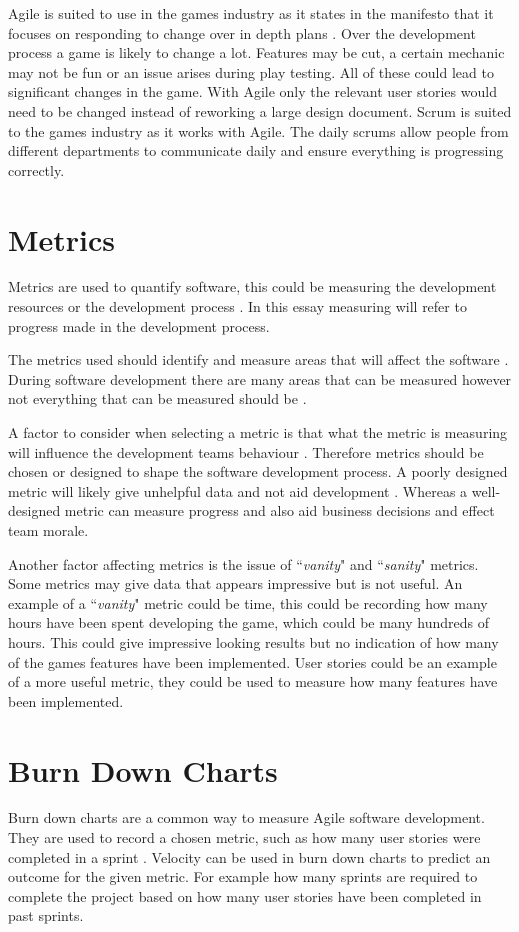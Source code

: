 \documentclass{scrartcl}
\begin{document}
Agile is suited to use in the games industry as it states in the manifesto that it focuses on responding to change over in depth plans \cite{AgileManifesto}.  Over the development process a game is likely to change a lot. Features may be cut, a certain mechanic may not be fun or an issue arises during play testing. All of these could lead to significant changes in the game. With Agile only the relevant user stories would need to be changed instead of reworking a large design document. Scrum is suited to the games industry as it works with Agile. The daily scrums allow people from different departments to communicate daily and ensure everything is progressing correctly.


\section{Metrics}

Metrics are used to quantify software, this could be measuring the development resources or the development process \cite{Misra}. In this essay measuring will refer to progress made in the development process. 

The metrics used should identify and measure areas that will affect the software \cite{Misra}. During software development there are many areas that can be measured however not everything that can be measured should be \cite{Hartmann}.

A factor to consider when selecting a metric is that what the metric is measuring will influence the development teams behaviour \cite{Hartmann}.  Therefore metrics should be chosen or designed to shape the software development process. A poorly designed metric will likely give unhelpful data and not aid development \cite{Ktata}. Whereas a well-designed metric can measure progress and also aid business decisions and effect team morale. \cite{Misra}

Another factor affecting metrics is the issue of ``\textit{vanity}" and ``\textit{sanity}" metrics. Some metrics may give data that appears impressive but is not useful. An example of a ``\textit{vanity}" metric could be time, this could be recording how many hours have been spent developing the game, which could be many hundreds of hours. This could give impressive looking results but no indication of how many of the games features have been implemented. User stories could be an example of a more useful metric, they could be used to measure how many features have been implemented.


\section{Burn Down Charts}
Burn down charts are a common way to measure Agile software development. They are used to record a chosen metric, such as how many user stories were completed in a sprint \cite{AgileWithScrum}. Velocity can be used in burn down charts to predict an outcome for the given metric. For example how many sprints are required to complete the project based on how many user stories have been completed in past sprints.
\end{document}
